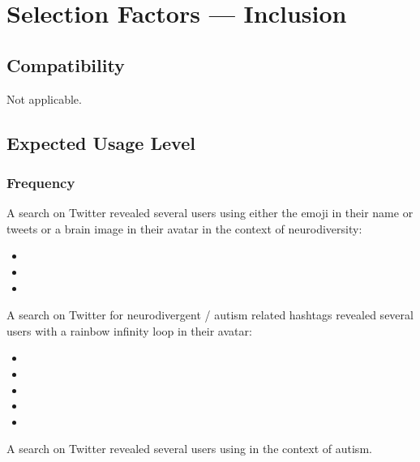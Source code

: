 \section{Selection Factors --- Inclusion}

\subsection{Compatibility}
Not applicable.

\subsection{Expected Usage Level}

\subsubsection{Frequency}

A search on Twitter revealed several users using either the \brainemoji{} emoji in their name
or tweets or a brain image in their avatar in the context of neurodiversity:
\begin{itemize}
  \item {}
  \item {}
  \item {}
\end{itemize}

A search on Twitter for neurodivergent / autism related hashtags revealed several users with a rainbow
infinity loop in their avatar:

\begin{itemize}
  \item {}
  \item {}
  \item {}
  \item {}
  \item {}
\end{itemize}

A search on Twitter revealed several users using \jigsawemoji{} in the context of autism.

